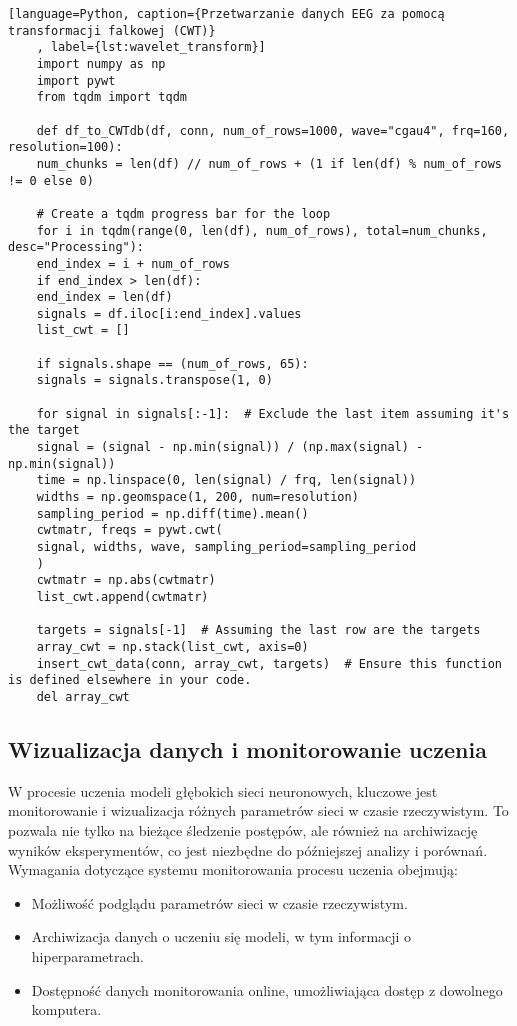 \documentclass[12pt,twoside]{article}
\begin{document}
    \begin{lstlisting}[language=Python, caption={Przetwarzanie danych EEG za pomocą transformacji falkowej (CWT)}
    , label={lst:wavelet_transform}]
    import numpy as np
    import pywt
    from tqdm import tqdm

    def df_to_CWTdb(df, conn, num_of_rows=1000, wave="cgau4", frq=160, resolution=100):
    num_chunks = len(df) // num_of_rows + (1 if len(df) % num_of_rows != 0 else 0)

    # Create a tqdm progress bar for the loop
    for i in tqdm(range(0, len(df), num_of_rows), total=num_chunks, desc="Processing"):
    end_index = i + num_of_rows
    if end_index > len(df):
    end_index = len(df)
    signals = df.iloc[i:end_index].values
    list_cwt = []

    if signals.shape == (num_of_rows, 65):
    signals = signals.transpose(1, 0)

    for signal in signals[:-1]:  # Exclude the last item assuming it's the target
    signal = (signal - np.min(signal)) / (np.max(signal) - np.min(signal))
    time = np.linspace(0, len(signal) / frq, len(signal))
    widths = np.geomspace(1, 200, num=resolution)
    sampling_period = np.diff(time).mean()
    cwtmatr, freqs = pywt.cwt(
    signal, widths, wave, sampling_period=sampling_period
    )
    cwtmatr = np.abs(cwtmatr)
    list_cwt.append(cwtmatr)

    targets = signals[-1]  # Assuming the last row are the targets
    array_cwt = np.stack(list_cwt, axis=0)
    insert_cwt_data(conn, array_cwt, targets)  # Ensure this function is defined elsewhere in your code.
    del array_cwt
\end{lstlisting}

\subsection{Wizualizacja danych i monitorowanie uczenia}
W procesie uczenia modeli głębokich sieci neuronowych, kluczowe jest monitorowanie i wizualizacja różnych parametrów
sieci w czasie rzeczywistym. To pozwala nie tylko na bieżące śledzenie postępów, ale również na archiwizację wyników
eksperymentów, co jest niezbędne do późniejszej analizy i porównań. Wymagania dotyczące systemu monitorowania procesu
uczenia obejmują:
\begin{itemize}
    \item Możliwość podglądu parametrów sieci w czasie rzeczywistym.
    \item Archiwizacja danych o uczeniu się modeli, w tym informacji o hiperparametrach.
    \item Dostępność danych monitorowania online, umożliwiająca dostęp z dowolnego komputera.
\end{itemize}
\end{document}
